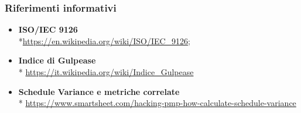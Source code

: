 \subsubsection{Riferimenti informativi}
\begin{itemize}
\item \textbf{ISO/IEC 9126} \\*\href{https://en.wikipedia.org/wiki/ISO/IEC_9126}{https://en.wikipedia.org/wiki/ISO/IEC\_9126};
\item \textbf{Indice di Gulpease} \\* \href{https://it.wikipedia.org/wiki/Indice_Gulpease}{https://it.wikipedia.org/wiki/Indice\_Gulpease}



\item \textbf{Schedule Variance e metriche correlate}\\* \href{https://www.smartsheet.com/hacking-pmp-how-calculate-schedule-variance}{https://www.smartsheet.com/hacking-pmp-how-calculate-schedule-variance}

\end{itemize}